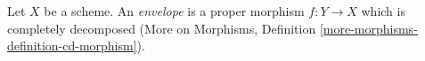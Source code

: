 \begin{definition}
\label{definition-envelope}
\begin{reference}
\cite[Definition 18.3]{F}
\end{reference}
Let $X$ be a scheme. An {\it envelope} is a proper morphism $f : Y \to X$
which is completely decomposed
(More on Morphisms, Definition \ref{more-morphisms-definition-cd-morphism}).
\end{definition}